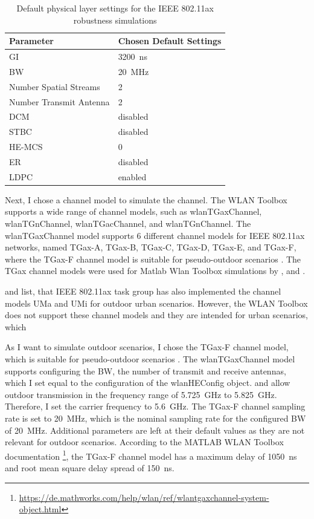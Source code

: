 \begin{table}
	\centering
	\begin{tabular}{>{\raggedright}p{4.5cm}p{4.5cm}}
		\toprule
		Parameter & Chosen Default Settings \\
		\midrule
		\ac{GI} & \SI{3200}{\nano\second} \\
		\ac{BW} & \SI{20}{\mega\hertz} \\
		Number Spatial Streams & \num{2}\\
		Number Transmit Antenna & \num{2} \\
		\ac{DCM} & disabled \\
		\ac{STBC} & disabled \\
		\ac{HE}-\ac{MCS} & \num{0} \\
		\ac{ER} & disabled \\
		\ac{LDPC} & enabled \\
		\bottomrule
	\end{tabular}
	\caption{Default physical layer settings for the IEEE 802.11ax robustness simulations}
	\label{tab:robustnessDefaultSettings}
\end{table}

Next, I chose a channel model to simulate the channel.
The WLAN Toolbox supports a wide range of channel models, such as wlanTGaxChannel, wlanTGnChannel, wlanTGacChannel, and wlanTGnChannel.
The wlanTGaxChannel model supports \num{6} different channel models for IEEE 802.11ax networks, named TGax-A, TGax-B, TGax-C, TGax-D, TGax-E, and TGax-F,
where the TGax-F channel model is suitable for pseudo-outdoor scenarios \cite{TGAXCHANNEL}.
The TGax channel models were used for Matlab Wlan Toolbox simulations by \cite{s_performance_2022}, \cite{cao_efficient_2022} and \cite{jin_efficient_2021}.

\cite{TGAXCHANNEL} and \cite{omar_survey_2016} list, that IEEE 802.11ax task group has also implemented the channel models UMa and UMi for
outdoor urban scenarios.
However, the WLAN Toolbox does not support these channel models and they are intended for urban scenarios, which

As I want to simulate outdoor scenarios, I chose the TGax-F channel model, which is suitable for pseudo-outdoor scenarios \cite{TGAXCHANNEL}.
The wlanTGaxChannel model supports configuring the \ac{BW}, the number of transmit and receive antennas, which I set equal to the configuration of the wlanHEConfig object.
\cite{freq_plan_24G} and \cite{freq_plan_5G} allow outdoor transmission in the frequency range of \SI{5.725}{\giga\hertz} to \SI{5.825}{\giga\hertz}.
Therefore, I set the carrier frequency to \SI{5.6}{\giga\hertz}.
The TGax-F channel sampling rate is set to \SI{20}{\mega\hertz}, which is the nominal sampling rate for the configured \ac{BW} of \SI{20}{\mega\hertz}.
Additional parameters are left at their default values as they are not relevant for outdoor scenarios.
According to the MATLAB WLAN Toolbox documentation \footnote{\url{https://de.mathworks.com/help/wlan/ref/wlantgaxchannel-system-object.html}},
the TGax-F channel model has a maximum delay of \SI{1050}{\nano\second} and root mean square delay spread of \SI{150}{\nano\second}.

